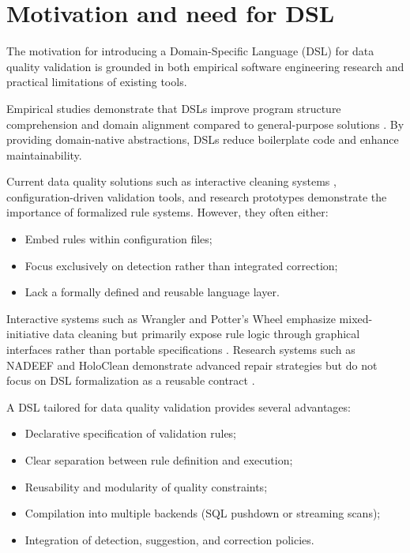 \section{Motivation and need for DSL}

The motivation for introducing a Domain-Specific Language (DSL) for data quality
validation is grounded in both empirical software engineering research and
practical limitations of existing tools.

Empirical studies demonstrate that DSLs improve program structure comprehension
and domain alignment compared to general-purpose solutions
\cite{dsl-empirical-2025}. By providing domain-native abstractions, DSLs reduce
boilerplate code and enhance maintainability.

Current data quality solutions such as interactive cleaning systems
\cite{wrangler,raman2001potterswheel}, configuration-driven validation tools, and
research prototypes \cite{nadeef,holoclean,falcon,jayvee} demonstrate the
importance of formalized rule systems. However, they often either:
\begin{itemize}[label=-, noitemsep]
    \item Embed rules within configuration files;
    \item Focus exclusively on detection rather than integrated correction;
    \item Lack a formally defined and reusable language layer.
\end{itemize}

Interactive systems such as Wrangler and Potter's Wheel emphasize
mixed-initiative data cleaning but primarily expose rule logic through graphical
interfaces rather than portable specifications
\cite{wrangler,raman2001potterswheel}. Research systems such as NADEEF and
HoloClean demonstrate advanced repair strategies but do not focus on DSL
formalization as a reusable contract \cite{nadeef,holoclean}.

A DSL tailored for data quality validation provides several advantages:
\begin{itemize}[label=-, noitemsep]
    \item Declarative specification of validation rules;
    \item Clear separation between rule definition and execution;
    \item Reusability and modularity of quality constraints;
    \item Compilation into multiple backends (SQL pushdown or streaming scans);
    \item Integration of detection, suggestion, and correction policies.
\end{itemize}

